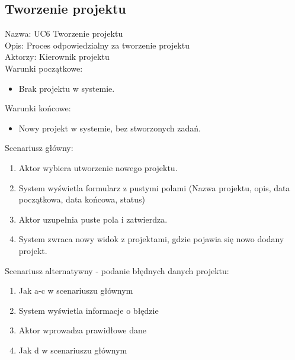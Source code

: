 \subsection{Tworzenie projektu}
Nazwa: UC6 Tworzenie projektu\\
Opis: Proces odpowiedzialny za tworzenie projektu\\
Aktorzy: Kierownik projektu \\
Warunki początkowe:
\begin{itemize}
\item Brak projektu w systemie.
\end{itemize}
Warunki końcowe:
\begin{itemize}
\item Nowy projekt w systemie, bez stworzonych zadań.
\end{itemize}
Scenariusz główny:
\begin{enumerate}
\item Aktor wybiera utworzenie nowego projektu.
\item System wyświetla formularz z pustymi polami (Nazwa projektu, opis, data początkowa, data końcowa, status)
\item Aktor uzupełnia puste pola i zatwierdza.
\item System zwraca nowy widok z projektami, gdzie pojawia się nowo dodany projekt.
\end{enumerate}
Scenariusz alternatywny - podanie błędnych danych projektu: 
\begin{enumerate}
\item Jak a-c w scenariuszu głównym
\item System wyświetla informacje o błędzie
\item Aktor wprowadza prawidłowe dane
\item Jak d w scenariuszu głównym
\end{enumerate}

